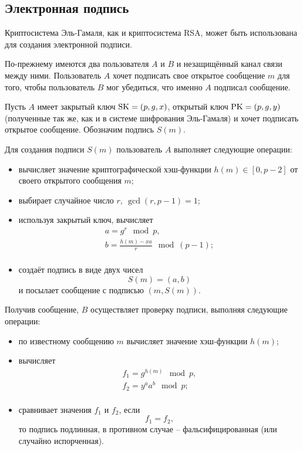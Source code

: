 \exampleend
{}

\subsection{Электронная подпись}

Криптосистема Эль-Гамаля, как и криптосистема RSA, может быть использована для создания электронной подписи.

По-прежнему имеются два пользователя $A$ и $B$ и незащищённый канал связи между ними. Пользователь $A$ хочет подписать свое открытое сообщение $m$ для того, чтобы пользователь $B$ мог убедиться, что именно $A$ подписал сообщение.

Пусть $A$ имеет закрытый ключ $\textrm{SK} = (p, g, x)$, открытый ключ $\textrm{PK} = (p, g, y)$ (полученные так же, как и в системе шифрования Эль-Гамаля) и хочет подписать открытое сообщение. Обозначим подпись $S(m)$.

Для создания подписи $S(m)$ пользователь $A$ выполняет следующие операции:
\begin{itemize}
    \item вычисляет значение криптографической хэш-функции $h(m) \in [0,p-2]$ от своего открытого сообщения $m$;
    \item выбирает случайное число $r, ~ \gcd(r, p-1)=1$;
    \item используя закрытый ключ, вычисляет
        \[ \begin{array}{l}
            a = g^r \mod p, \\
            b = \frac{h(m) - xa}{r} \mod (p-1); \\
        \end{array} \]
    \item создаёт подпись в виде двух чисел
        \[ S(m) = (a, b) \]
        и посылает сообщение с подписью $(m, S(m))$.
\end{itemize}

Получив сообщение, $B$ осуществляет проверку подписи, выполняя следующие операции:
\begin{itemize}
    \item по известному сообщению $m$ вычисляет значение хэш-функции $h(m)$;
    \item вычисляет
        \[ \begin{array}{l}
            f_1 = g^{h(m)} \mod p, \\
            f_2 = y^a a^b \mod p; \\
        \end{array} \]
    \item сравнивает значения $f_1$ и $f_2$, если
        \[ f_1 = f_2, \]
        то подпись подлинная, в противном случае -- фальсифицированная (или случайно испорченная).
\end{itemize}

